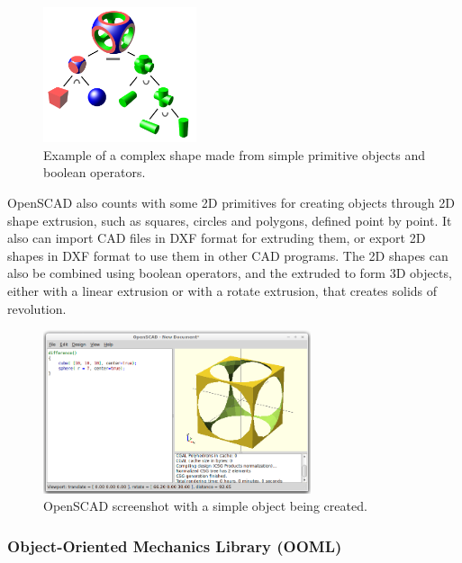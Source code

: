 \begin{figure}[h]
		\centering
        \includegraphics[width=0.4\textwidth]{images/Hardware_openscad_example.png}
        \caption{Example of a complex shape made from simple primitive objects and boolean operators.}\label{fig:hardware_openscad_example}
\end{figure} 

OpenSCAD also counts with some 2D primitives for creating objects through 2D shape extrusion, such as squares, circles and polygons, defined point by point. It also can import CAD files in DXF format for extruding them, or export 2D shapes in DXF format to use them in other CAD programs. The 2D shapes can also be combined using boolean operators, and the extruded to form 3D objects, either with a linear extrusion or with a rotate extrusion, that creates solids of revolution.\\

\begin{figure}[h]
		\centering
        \includegraphics[width=0.7\textwidth]{images/Hardware_openscad_example2.png}
        \caption{OpenSCAD screenshot with a simple object being created.}
        \label{fig:hardware_openscad_example2}
\end{figure} 


\subsubsection{Object-Oriented Mechanics Library (OOML)}
\label{hardware_software_ooml}

